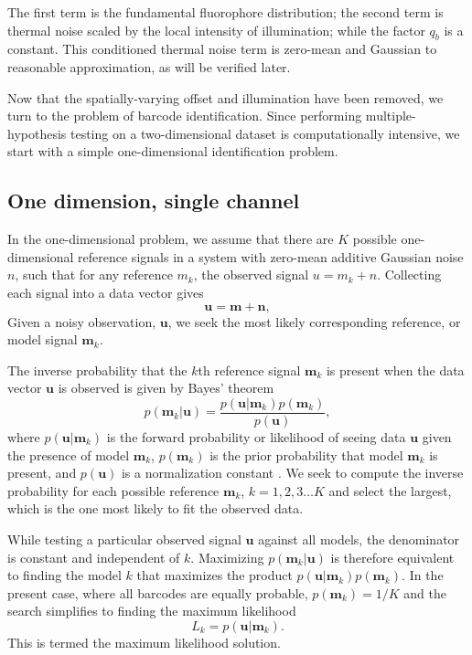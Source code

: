 The first term is the fundamental fluorophore distribution; the second term is thermal noise scaled by the local intensity of illumination; while the factor $q_b$ is a constant. This conditioned thermal noise term is zero-mean and Gaussian to reasonable approximation, as will be verified later.

Now that the spatially-varying offset and illumination have been removed, we turn to the problem of barcode identification. Since performing multiple-hypothesis testing on a two-dimensional dataset is computationally intensive, we start with a simple one-dimensional identification problem. 

\subsection{One dimension, single channel}
In the one-dimensional problem, we assume that there are $K$ possible one-dimensional reference signals in a system with zero-mean additive Gaussian noise $n$, such that for any reference $m_k$, the observed signal $u=m_k+n$. Collecting each signal into a data vector gives
\begin{equation}
\mathbf{u}=\mathbf{m} + \mathbf{n},
\end{equation}
Given a noisy observation, $\mathbf{u}$, we seek the most likely corresponding reference, or model signal $\mathbf{m}_k$. 

The inverse probability that the $k$th reference signal $\mathbf{m}_k$ is present when the data vector $\mathbf{u}$ is observed is given by Bayes' theorem
\begin{equation}\label{eq:Bayes}
p(\mathbf{m}_k|\mathbf{u}) = \frac{p(\mathbf{u}|\mathbf{m}_k)p(\mathbf{m}_k)} {p(\mathbf{u})},
\end{equation}
where $p(\mathbf{u}|\mathbf{m}_k)$ is the forward probability or likelihood of seeing data $\mathbf{u}$ given the presence of model $\mathbf{m}_k$, $p(\mathbf{m}_k)$ is the prior probability that model $\mathbf{m}_k$ is present, and $p(\mathbf{u})$ is a normalization constant \citep{bretthorst_probability_2003}. We seek to compute the inverse probability for each possible reference $\mathbf{m}_k$, $k=1,2,3 \ldots K$ and select the largest, which is the one most likely to fit the observed data.

While testing a particular observed signal $\mathbf{u}$ against all models, the denominator is constant and independent of $k$. Maximizing $p(\mathbf{m}_k|\mathbf{u})$ is therefore equivalent to finding the model $k$ that maximizes the product  $p(\mathbf{u}|\mathbf{m}_k)p(\mathbf{m}_k)$.
In the present case, where all barcodes are equally probable,
$p(\mathbf{m}_k)=1/K$ 
and the search simplifies to finding the maximum likelihood 
\begin{equation}
L_k = p(\mathbf{u}|\mathbf{m}_k).
\end{equation}
This is termed the maximum likelihood solution.


